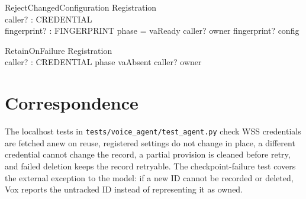 \documentclass[a4paper,10pt,fleqn]{article}
\begin{document}
\begin{schema}{RejectChangedConfiguration}
  \Xi Registration \\
  caller? : CREDENTIAL \\
  fingerprint? : FINGERPRINT
\where
  phase = vaReady \land caller? \in owner \land fingerprint? \notin config
\end{schema}

\begin{schema}{RetainOnFailure}
  \Xi Registration \\
  caller? : CREDENTIAL
\where
  phase \neq vaAbsent \land caller? \in owner
\end{schema}

\section{Correspondence}

The localhost tests in \texttt{tests/voice\_agent/test\_agent.py} check
WSS credentials are fetched anew on reuse, registered settings do not
change in place, a different credential cannot change the record, a
partial provision is cleaned before retry, and failed deletion keeps
the record retryable. The checkpoint-failure test covers the external
exception to the model: if a new ID cannot be recorded or deleted, Vox
reports the untracked ID instead of representing it as owned.
\end{document}

